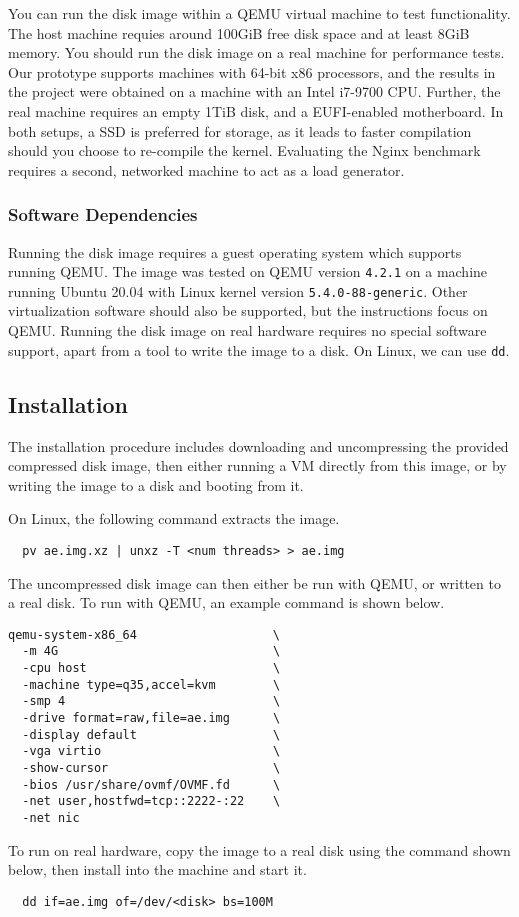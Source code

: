 You can run the disk image within a QEMU virtual machine to test
functionality.
The host machine requies around 100GiB free disk space and at least
8GiB memory.
You should run the disk image on a real machine for performance
tests.
Our \midas{} prototype supports machines with 64-bit x86 processors, 
and the results in the project were obtained on a machine with an 
Intel i7-9700 CPU.
Further, the real machine requires an empty 1TiB disk, and a 
EUFI-enabled motherboard.
In both setups, a SSD is preferred for storage, as it leads to
faster compilation should you choose to re-compile the kernel.
Evaluating the Nginx benchmark requires a second, networked machine
to act as a load generator.

\subsubsection{Software Dependencies}

Running the \midas{} disk image requires a guest operating system
which supports running QEMU.
The image was tested on QEMU version \texttt{4.2.1} on a machine running
Ubuntu 20.04 with Linux kernel version \texttt{5.4.0-88-generic}.
Other virtualization software should also be supported, but the 
instructions focus on QEMU.
Running the disk image on real hardware requires no special software 
support, apart from a tool to write the image to a disk.
On Linux, we can use \texttt{dd}.

\subsection{Installation}

The installation procedure includes downloading and uncompressing 
the provided compressed disk image, then either running a VM directly
from this image, or by writing the image to a disk and booting from it.

On Linux, the following command extracts the image.
\begin{verbatim}
  pv ae.img.xz | unxz -T <num threads> > ae.img
\end{verbatim}
The uncompressed disk image can then either be run with QEMU, or 
written to a real disk.
To run with QEMU, an example command is shown below.
\begin{verbatim}
qemu-system-x86_64                   \
  -m 4G                              \
  -cpu host                          \
  -machine type=q35,accel=kvm        \
  -smp 4                             \
  -drive format=raw,file=ae.img      \
  -display default                   \
  -vga virtio                        \
  -show-cursor                       \
  -bios /usr/share/ovmf/OVMF.fd      \
  -net user,hostfwd=tcp::2222-:22    \
  -net nic
\end{verbatim}
To run on real hardware, copy the image to a real disk using the 
command shown below, then install into the machine and start it.
\begin{verbatim}
  dd if=ae.img of=/dev/<disk> bs=100M
\end{verbatim}

